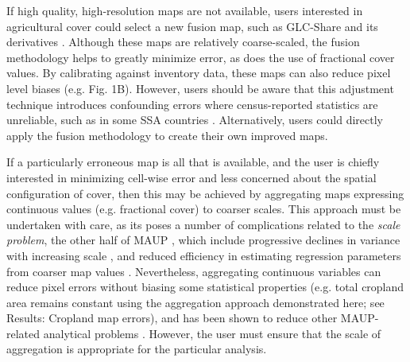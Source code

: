 \documentclass[12 pt, titlepage, a4paper]{article}
\begin{document}
If high quality, high-resolution maps are not available, users interested in agricultural cover could select a new fusion map, such as GLC-Share and its derivatives \citep{fritz_mapping_2015,waldner_unified_2016}. Although these maps are relatively coarse-scaled, the fusion methodology helps to greatly minimize error, as does the use of fractional cover values. By calibrating against inventory data, these maps can also reduce pixel level biases (e.g. Fig. 1B). However, users should be aware that this adjustment technique introduces confounding errors where census-reported statistics are unreliable, such as in some SSA countries \citep{carletto_emperor_2013,carletto_guesstimates_2015}.  Alternatively, users could directly apply the fusion methodology \citep{fritz_cropland_2011} to create their own improved maps. 

If a particularly erroneous map is all that is available, and the user is chiefly interested in minimizing cell-wise error and less concerned about the spatial configuration of cover, then this may be achieved by aggregating maps expressing continuous values (e.g. fractional cover) to coarser scales. This approach must be undertaken with care, as its poses a number of complications related to the \emph{scale problem}, the other half of MAUP \citep{openshaw_million_1979}, which include progressive declines in variance with increasing scale \citep[even if means remain constant;][]{dark_modifiable_2007}, and reduced efficiency in estimating regression parameters from coarser map values \citep[][]{avelino_goldilocks_2016}. Nevertheless, aggregating continuous variables can reduce pixel errors without biasing some statistical properties (e.g. total cropland area remains constant using the aggregation approach demonstrated here; see Results: Cropland map errors), and has been shown to reduce other MAUP-related analytical problems \citep{avelino_goldilocks_2016}. However, the user must ensure that the scale of aggregation is appropriate for the particular analysis.   
\end{document}
